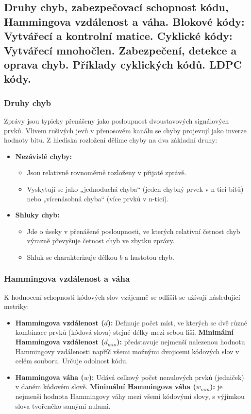 \subsection{Druhy chyb, zabezpečovací schopnost kódu, Hammingova vzdálenost a váha. Blokové kódy: Vytvářecí a kontrolní matice. Cyklické kódy: Vytvářecí mnohočlen. Zabezpečení, detekce a oprava chyb. Příklady cyklických kódů. LDPC kódy.}
    \subsubsection{Druhy chyb}
        Zprávy jsou typicky přenášeny jako posloupnost dvoustavových signálových prvků. Vlivem rušivých jevů v přenosovém kanálu  se chyby projevují jako inverze hodnoty bitu. Z hlediska rozložení dělíme chyby na dva základní druhy:
        \begin{itemize}
            \item \textbf{Nezávislé chyby:} 
            \begin{itemize}
                \item Jsou relativně rovnoměrně rozloženy v přijaté zprávě.
                \item Vyskytují se jako „jednoduchá chyba“ (jeden chybný prvek v n-tici bitů) nebo „vícenásobná chyba“ (více prvků v n-tici).
            \end{itemize}
            \item \textbf{Shluky chyb:} 
            \begin{itemize}
                \item Jde o úseky v přenášené posloupnosti, ve kterých relativní četnost chyb výrazně převyšuje četnost chyb ve zbytku zprávy.
                \item Shluk se charakterizuje délkou $b$ a hustotou chyb.
            \end{itemize}
        \end{itemize}
    \subsubsection{Hammingova vzdálenost a váha}
        K hodnocení schopnosti kódových slov vzájemně se odlišit se užívají následující metriky:
        \begin{itemize}
            \item \textbf{Hammingova vzdálenost ($d$):} Definuje počet míst, ve kterých se dvě různé kombinace prvků (kódová slova) stejné délky mezi sebou liší. \textbf{Minimální Hammingova vzdálenost ($d_{min}$):} představuje nejmenší nalezenou hodnotu Hammingovy vzdálenosti napříč všemi možnými dvojicemi kódových slov v celém souboru. Určuje odolnost kódu.
            \item \textbf{Hammingova váha ($w$):} Udává celkový počet nenulových prvků (jedniček) v daném kódovém slově. \textbf{Minimální Hammingova váha ($w_{min}$):} je nejmenší hodnota Hammingovy váhy mezi všemi kódovými slovy, s výjimkou slova tvořeného samými nulami.
        \end{itemize}
